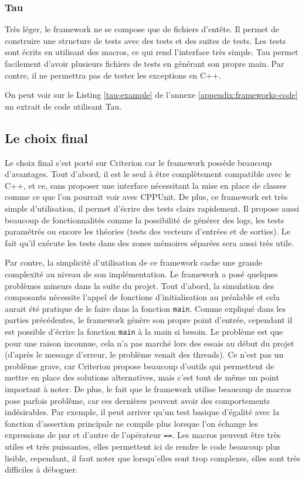 \documentclass[a4paper]{article}
\begin{document}
\subsubsection*{Tau}

Très léger, le framework ne se compose que de fichiers d'entête. Il permet de
construire une structure de tests avec des tests et des suites de tests. Les
tests sont écrits en utilisant des macros, ce qui rend l'interface très simple.
Tau permet facilement d'avoir plusieurs fichiers de tests en générant son propre
main. Par contre, il ne permettra pas de tester les exceptions en C++.

On peut voir sur le Listing \ref{tau-example} de l'annexe
\ref{appendix:frameworks-code} un extrait de code utilisant Tau.
\subsection{Le choix final}%

Le choix final s'est porté sur Criterion car le framework possède beaucoup
d'avantages. Tout d'abord, il est le seul à être complètement compatible avec le
C++, et ce, sans proposer une interface nécessitant la mise en place de classes
comme ce que l'on pourrait voir avec CPPUnit. De plus, ce framework est très
simple d'utilisation, il permet d'écrire des tests clairs rapidement. Il propose
aussi beaucoup de fonctionnalités comme la possibilité de générer des logs, les
tests paramétrés ou encore les théories (tests des vecteurs d'entrées et de
sorties). Le fait qu'il exécute les tests dans des zones mémoires séparées sera
aussi très utile.

Par contre, la simplicité d'utilisation de ce framework cache une grande
complexité au niveau de son implémentation. Le framework a posé quelques
problèmes mineurs dans la suite du projet. Tout d'abord, la simulation des
composants nécessite l'appel de fonctions d'initialisation au préalable et cela
aurait été pratique de le faire dans la fonction \verb|main|. Comme
expliqué dans les parties précédentes, le framework génère son propre point
d'entrée, cependant il est possible d'écrire la fonction \verb|main| à la
main si besoin. Le problème est que pour une raison inconnue, cela n'a pas
marché lors des essais au début du projet (d'après le message d'erreur, le
problème venait des threads). Ce n'est pas un problème grave, car Criterion
propose beaucoup d'outils qui permettent de mettre en place des solutions
alternatives, mais c'est tout de même un point important à noter. De plus, le
fait que le framework utilise beaucoup de macros pose parfois problème, car ces
dernières peuvent avoir des comportements indésirables. Par exemple, il peut
arriver qu'un test basique d'égalité avec la fonction d'assertion principale ne
compile plus lorsque l'on échange les expressions de par et d'autre de
l'opérateur \verb|==|. Les macros peuvent être très utiles et très
puissantes, elles permettent ici de rendre le code beaucoup plus lisible,
cependant, il faut noter que lorsqu'elles sont trop complexes, elles sont très
difficiles à déboguer.
\end{document}
